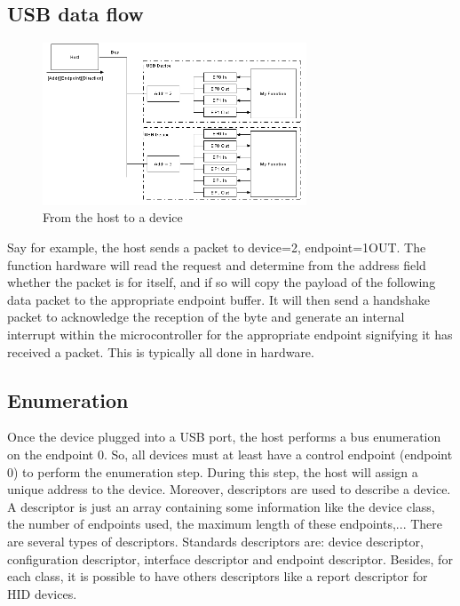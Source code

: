 \documentclass[pdftex,12pt,a4paper]{report}
\begin{document}
\subsection{USB data flow}

\begin{figure}[h!]
		\centering
		\includegraphics[width=0.7\textwidth]{./data_flow.jpg}
		\caption{From the host to a device}
		\label{From the host to a device}
\end{figure}

Say for example, the host sends a packet to device=2, endpoint=1OUT. The function hardware will read the request and determine from the address field whether the packet is for itself, and if so will copy the payload of the following data packet to the appropriate endpoint buffer. It will then send a handshake packet to acknowledge the reception of the byte and generate an internal interrupt within the microcontroller for the appropriate endpoint signifying it has received a packet. This is typically all done in hardware.
\\

\subsection{Enumeration}
Once the device plugged into a USB port, the host performs a bus enumeration on the endpoint 0. So, all devices must at least have a control endpoint (endpoint 0) to perform the enumeration step. During this step, the host will assign a unique address to the device. Moreover, descriptors are used to describe a device. A descriptor is just an array containing some information like the device class, the number of endpoints used, the maximum length of these endpoints,... There are several types of descriptors. Standards descriptors are: device descriptor, configuration descriptor, interface descriptor and endpoint descriptor. Besides, for each class, it is possible to have others descriptors like a report descriptor for HID devices.
\\
\end{document}
